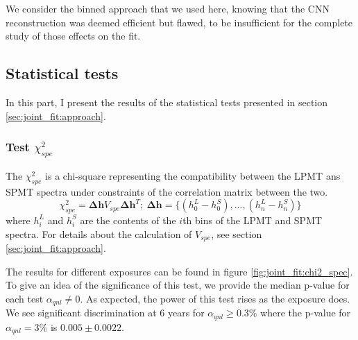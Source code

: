 \documentclass[../main.tex]{subfiles}
\begin{document}
We consider the binned approach that we used here, knowing that the CNN reconstruction was deemed efficient but flawed, to be insufficient for the complete study of those effects on the fit.

\subsection{Statistical tests}

In this part, I present the results of the statistical tests presented in section \ref{sec:joint_fit:approach}.

\subsubsection{Test $\chi^2_{spe}$}

The $\chi^2_{spe}$ is a chi-square representing the compatibility between the LPMT ans SPMT spectra under constraints of the correlation matrix between the two.
\begin{equation}
  \chi^2_{spe} = \bm{\Delta h} V_{spe} \bm{\Delta h}^T; ~ \bm{\Delta h} = \{ (h_0^L - h_0^S), ..., (h_n^L - h_n^S) \}
\end{equation}
where $h_i^L$ and $h_i^S$ are the contents of the $i$th bins of the LPMT and SPMT spectra. For details about the calculation of $V_{spe}$, see section \ref{sec:joint_fit:approach}.

The results for different exposures can be found in figure \ref{fig:joint_fit:chi2_spec}. To give an idea of the significance of this test, we provide the median p-value for each test $\alpha_{qnl} \neq 0$. As expected, the power of this test rises as the exposure does. We see significant discrimination at 6 years for $\alpha_{qnl} \geq 0.3 \%$ where the p-value for $\alpha_{qnl} = 3\%$ is $0.005 \pm 0.0022$.
\end{document}
